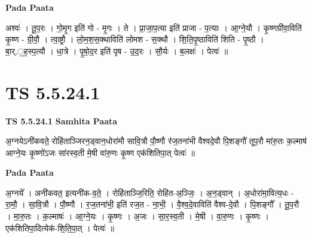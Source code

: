 \documentclass[17pt]{extarticle}
\begin{document}
\textbf{Pada Paata} \newline

अश्वः॑ । तू॒प॒रः । गो॒मृ॒ग इति॑ गो - मृ॒गः । ते । प्रा॒जा॒प॒त्या इति॑ प्राजा - प॒त्याः । आ॒ग्ने॒यौ । कृ॒ष्णग्री॑वा॒विति॑ कृ॒ष्ण - ग्री॒वौ॒ । त्वा॒ष्ट्रौ । लो॒म॒श॒स॒क्थाविति॑ लोमश - स॒क्थौ । शि॒ति॒पृ॒ष्ठाविति॑ शिति - पृ॒ष्ठौ । बा॒र्.॒ह॒स्प॒त्यौ । धा॒त्रे । पृ॒षो॒द॒र इति॑ पृष - उ॒द॒रः । सौ॒र्यः । ब॒लक्षः॑ । पेत्वः॑ ॥  \newline





\section{ TS 5.5.24.1 }

\textbf{TS 5.5.24.1 } \newline
\textbf{Samhita Paata} \newline

अ॒ग्नयेऽनी॑कवते॒ रोहि॑ताञ्जिरन॒ड्वान॒धोरा॑मौ सावि॒त्रौ पौ॒ष्णौ र॑ज॒तना॑भी वैश्वदे॒वौ पि॒शङ्गौ॑ तूप॒रौ मा॑रु॒तः क॒ल्माष॑ आग्ने॒यः कृ॒ष्णो॑ऽजः सा॑रस्व॒ती मे॒षी वा॑रु॒णः कृ॒ष्ण एक॑शितिपा॒त् पेत्वः॑ ॥ \newline

\textbf{Pada Paata} \newline

अ॒ग्नये᳚ । अनी॑कवत॒ इत्यनी॑क-व॒ते॒ । रोहि॑ताञ्जि॒रिति॒ रोहि॑त-अ॒ञ्जिः॒ । अ॒न॒ड्वान् । अ॒धोरा॑मा॒वित्य॒धः - रा॒मौ॒ । सा॒वि॒त्रौ । पौ॒ष्णौ । र॒ज॒तना॑भी॒ इति॑ रज॒त - ना॒भी॒ । वै॒श्व॒दे॒वाविति॑ वैश्व-दे॒वौ । पि॒शङ्गौ᳚ । तू॒प॒रौ । मा॒रु॒तः । क॒ल्माषः॑ । आ॒ग्ने॒यः । कृ॒ष्णः । अ॒जः । सा॒र॒स्व॒ती । मे॒षी । वा॒रु॒णः । कृ॒ष्णः । एक॑शितिपा॒दित्येक॑-शि॒ति॒पा॒त् । पेत्वः॑ ॥  \newline
\end{document}
